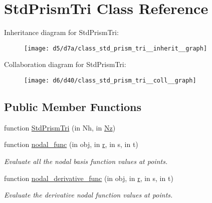 \hypertarget{class_std_prism_tri}{}\section{Std\+Prism\+Tri Class Reference}
\label{class_std_prism_tri}


Inheritance diagram for Std\+Prism\+Tri\+:
\nopagebreak
\begin{figure}[H]
\begin{center}
\leavevmode
\texttt{[image: d5/d7a/class\_std\_prism\_tri\_\_inherit\_\_graph]}
\end{center}
\end{figure}


Collaboration diagram for Std\+Prism\+Tri\+:
\nopagebreak
\begin{figure}[H]
\begin{center}
\leavevmode
\texttt{[image: d6/d40/class\_std\_prism\_tri\_\_coll\_\_graph]}
\end{center}
\end{figure}
\subsection*{Public Member Functions}
\begin{DoxyCompactItemize}
\item 
function \hyperlink{class_std_prism_tri_abef1448e566aa46a77db6122ba6673ea}{Std\+Prism\+Tri} (in Nh, in \hyperlink{class_std_prism_tri_a6d9a746cf2d10610a759d8a3dce6f8e7}{Nz})
\item 
function \hyperlink{class_std_prism_tri_ace75f32449fc2e45d3b0d737e8a7a477}{nodal\+\_\+func} (in obj, in \hyperlink{class_std_prism_tri_aad8e1b11ac7552139fe6aacc8728b249}{r}, in s, in t)
\begin{DoxyCompactList}\small\item\em Evaluate all the nodal basis function values at points. \end{DoxyCompactList}\item 
function \hyperlink{class_std_prism_tri_a1fcf29bd47a8e4d8e4ecbee0d4e5c8d7}{nodal\+\_\+derivative\+\_\+func} (in obj, in \hyperlink{class_std_prism_tri_aad8e1b11ac7552139fe6aacc8728b249}{r}, in s, in t)
\begin{DoxyCompactList}\small\item\em Evaluate the derivative nodal function values at points. \end{DoxyCompactList}\end{DoxyCompactItemize}
